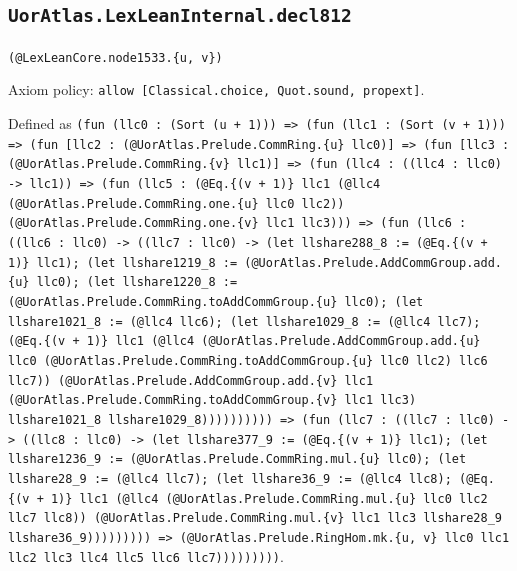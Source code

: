 \documentclass[11pt]{article}
\begin{document}
\subsection*{\texttt{UorAtlas.LexLeanInternal.decl812}}
\noindent\texttt{(@LexLeanCore.node1533.\{u, v\})}\par
\noindent Axiom policy: \texttt{allow [Classical.choice, Quot.sound, propext]}.\par
\noindent Defined as \texttt{(fun (llc0 : (Sort (u + 1))) => (fun (llc1 : (Sort (v + 1))) => (fun [llc2 : (@UorAtlas.Prelude.CommRing.\{u\} llc0)] => (fun [llc3 : (@UorAtlas.Prelude.CommRing.\{v\} llc1)] => (fun (llc4 : ((llc4 : llc0) -> llc1)) => (fun (llc5 : (@Eq.\{(v + 1)\} llc1 (@llc4 (@UorAtlas.Prelude.CommRing.one.\{u\} llc0 llc2)) (@UorAtlas.Prelude.CommRing.one.\{v\} llc1 llc3))) => (fun (llc6 : ((llc6 : llc0) -> ((llc7 : llc0) -> (let llshare288\_8 := (@Eq.\{(v + 1)\} llc1); (let llshare1219\_8 := (@UorAtlas.Prelude.AddCommGroup.add.\{u\} llc0); (let llshare1220\_8 := (@UorAtlas.Prelude.CommRing.toAddCommGroup.\{u\} llc0); (let llshare1021\_8 := (@llc4 llc6); (let llshare1029\_8 := (@llc4 llc7); (@Eq.\{(v + 1)\} llc1 (@llc4 (@UorAtlas.Prelude.AddCommGroup.add.\{u\} llc0 (@UorAtlas.Prelude.CommRing.toAddCommGroup.\{u\} llc0 llc2) llc6 llc7)) (@UorAtlas.Prelude.AddCommGroup.add.\{v\} llc1 (@UorAtlas.Prelude.CommRing.toAddCommGroup.\{v\} llc1 llc3) llshare1021\_8 llshare1029\_8)))))))))) => (fun (llc7 : ((llc7 : llc0) -> ((llc8 : llc0) -> (let llshare377\_9 := (@Eq.\{(v + 1)\} llc1); (let llshare1236\_9 := (@UorAtlas.Prelude.CommRing.mul.\{u\} llc0); (let llshare28\_9 := (@llc4 llc7); (let llshare36\_9 := (@llc4 llc8); (@Eq.\{(v + 1)\} llc1 (@llc4 (@UorAtlas.Prelude.CommRing.mul.\{u\} llc0 llc2 llc7 llc8)) (@UorAtlas.Prelude.CommRing.mul.\{v\} llc1 llc3 llshare28\_9 llshare36\_9))))))))) => (@UorAtlas.Prelude.RingHom.mk.\{u, v\} llc0 llc1 llc2 llc3 llc4 llc5 llc6 llc7)))))))))}.\par
\end{document}

